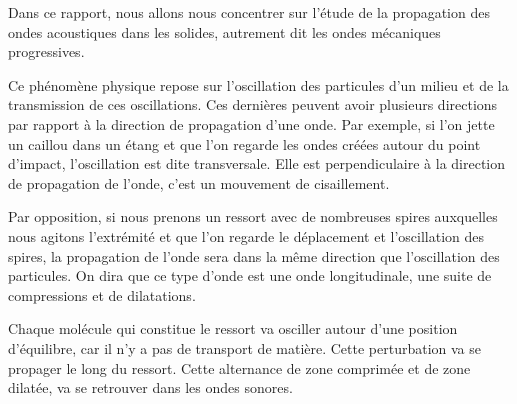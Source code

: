 Dans ce rapport, nous allons nous concentrer sur l'étude de la propagation
des ondes acoustiques dans les solides, autrement dit les ondes 
mécaniques progressives. 

Ce phénomène physique repose sur l'oscillation des particules 
d'un milieu et de la transmission de ces oscillations.
Ces dernières peuvent avoir plusieurs directions par rapport à la 
direction de propagation d'une onde.
Par exemple, si l'on jette un caillou dans un étang
et que l'on regarde les ondes créées autour du point d'impact,
l'oscillation est dite transversale. Elle est perpendiculaire
à la direction de propagation de l'onde, c'est un mouvement de cisaillement.

Par opposition, si nous prenons un ressort avec de nombreuses 
spires auxquelles nous agitons l'extrémité et que l'on regarde le 
déplacement et l'oscillation des spires, la propagation de l'onde sera
dans la même direction que l'oscillation des particules.
On dira que ce type d'onde est une onde longitudinale, une suite de
compressions et de dilatations.~\cite{royer-dieulesaint-acoustique}


Chaque molécule qui constitue le ressort va osciller autour
d'une position d'équilibre, car il n'y a pas de transport de matière.
Cette perturbation va se propager le long du ressort.
Cette alternance de zone comprimée et de zone dilatée, va se retrouver dans 
les ondes sonores.~\cite{revisions-bac}


\newpage

